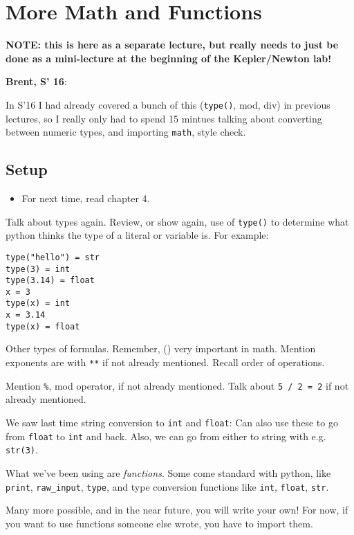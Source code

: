 \documentclass{article}
\newenvironment{reflect}[1]
{
  \begin{lrbox}{\reflectbox}
    \begin{minipage}[t]{\textwidth}
      \textbf{#1}:
}{
    \end{minipage}
  \end{lrbox}
  \fbox{\usebox{\reflectbox}}
}
\begin{document}
\newpage

\section{More Math and Functions}

\textbf{NOTE: this is here as a separate lecture, but really needs to
  just be done as a mini-lecture at the beginning of the Kepler/Newton
  lab!}

\begin{reflect}{Brent, S' 16}
  In S'16 I had already covered a bunch of this (\verb|type()|, mod,
  div) in previous lectures, so I really only had to spend 15 mintues
  talking about converting between numeric types, and importing
  \verb|math|, style check.
\end{reflect}

\subsection*{Setup}
\begin{itemize}
\item For next time, read chapter 4.
\end{itemize}

Talk about types again.  Review, or show again, use of \verb|type()|
to determine what python thinks the type of a literal or variable is.
For example:
\begin{verbatim}
type("hello") = str
type(3) = int
type(3.14) = float
x = 3
type(x) = int
x = 3.14
type(x) = float
\end{verbatim}

Other types of formulas.  Remember, () very important in math.
Mention exponents are with \verb|**| if not already mentioned. Recall
order of operations.

Mention \verb|%|, mod operator, if not already mentioned.
Talk about \verb|5 / 2 = 2| if not already mentioned.

We saw last time string conversion to \verb|int| and \verb|float|: Can
also use these to go from \verb|float| to \verb|int| and back.  Also,
we can go from either to string with e.g. \verb|str(3)|.

What we've been using are \emph{functions}.  Some come standard with
python, like \verb|print|, \verb|raw_input|, \verb|type|, and type
conversion functions like \verb|int|, \verb|float|, \verb|str|.

Many more possible, and in the near future, you will write your own!
For now, if you want to use functions someone else wrote, you have to
import them.
\end{document}
